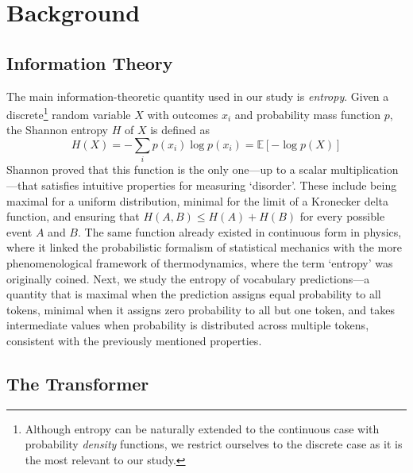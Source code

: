 \section{Background} \label{sec:bg}

\subsection{Information Theory}
The main information-theoretic quantity used in our study is \textit{entropy}. Given a discrete\footnote{Although entropy can be naturally extended to the continuous case with probability \textit{density} functions, we restrict ourselves to the discrete case as it is the most relevant to our study.} random variable $X$ with outcomes $x_i$ and probability mass function $p$, the Shannon entropy $H$ of $X$ is defined as 
\begin{equation}
    H(X) = - \sum_ip(x_i)\log p(x_i) = \mathbb{E}[-\log p(X)]
\end{equation}
Shannon proved that this function is the only one—up to a scalar multiplication—that satisfies intuitive properties for measuring `disorder'. These include being maximal for a uniform distribution, minimal for the limit of a Kronecker delta function, and ensuring that $H(A, B) \leq H(A) + H(B)$ for every possible event $A$ and $B$. The same function already existed in continuous form in physics, where it linked the probabilistic formalism of statistical mechanics with the more phenomenological framework of thermodynamics, where the term `entropy' was originally coined. \newline
Next, we study the entropy of vocabulary predictions—a quantity that is maximal when the prediction assigns equal probability to all tokens, minimal when it assigns zero probability to all but one token, and takes intermediate values when probability is distributed across multiple tokens, consistent with the previously mentioned properties. 

\subsection{The Transformer}
